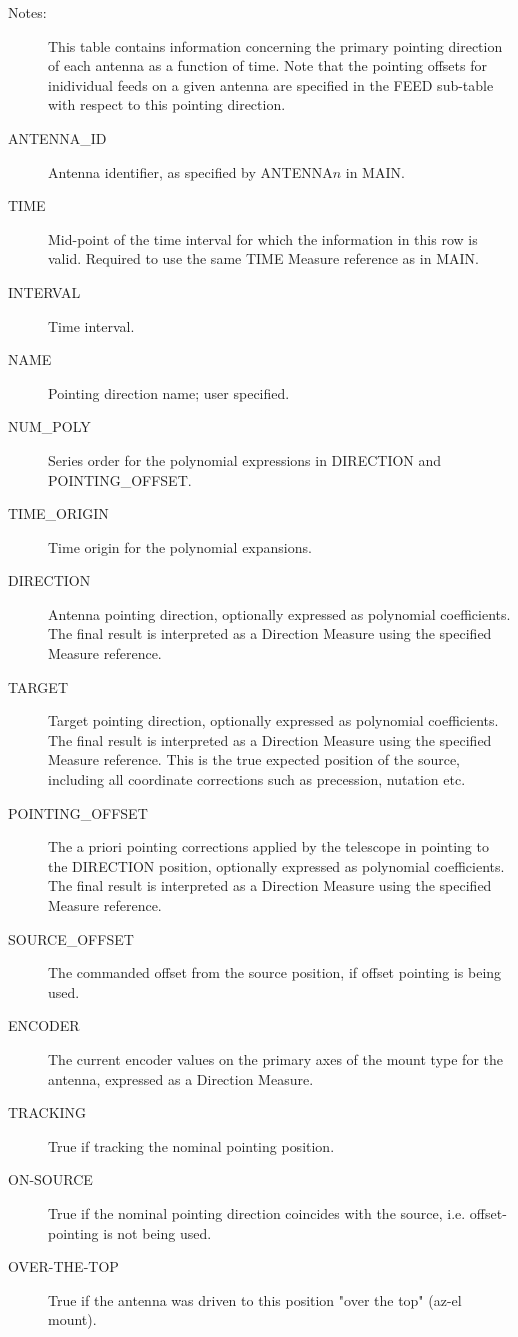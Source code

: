 \documentclass{article}
\begin{document}
\begin{description}

\item[Notes:] This table contains information concerning the primary
pointing direction of each antenna as a function of time. Note that
the pointing offsets for inidividual feeds on a given antenna are
specified in the FEED sub-table with respect to this pointing direction.

\item[ANTENNA\_ID] Antenna identifier, as specified by ANTENNA$n$ in MAIN.

\item[TIME] Mid-point of the time interval for which the information
in this row is valid. Required to use the same TIME Measure reference
as in MAIN.

\item[INTERVAL] Time interval.

\item[NAME] Pointing direction name; user specified.

\item[NUM\_POLY] Series order for the polynomial expressions in
DIRECTION and POINTING\_OFFSET.

\item[TIME\_ORIGIN] Time origin for the polynomial expansions.

\item[DIRECTION] Antenna pointing direction, optionally expressed as
polynomial coefficients. The final result is interpreted as a
Direction Measure using the specified Measure reference. 

\item[TARGET] Target pointing direction, optionally expressed as
polynomial coefficients. The final result is interpreted as a
Direction Measure using the specified Measure reference. This is the
true expected position of the source, including all coordinate
corrections such as precession, nutation etc.

\item[POINTING\_OFFSET] The a priori pointing corrections applied by
the telescope in pointing to the DIRECTION position, optionally
expressed as polynomial coefficients. The final result is interpreted
as a Direction Measure using the specified Measure reference.

\item[SOURCE\_OFFSET] The commanded offset from the source position,
if offset pointing is being used.

\item[ENCODER] The current encoder values on the primary axes of the
mount type for the antenna, expressed as a Direction Measure.

\item[TRACKING] True if tracking the nominal pointing position.

\item[ON-SOURCE] True if the nominal pointing direction coincides with
the source, i.e. offset-pointing is not being used.

\item[OVER-THE-TOP] True if the antenna was driven to this position
"over the top" (az-el mount).
\end{description}
\end{document}
